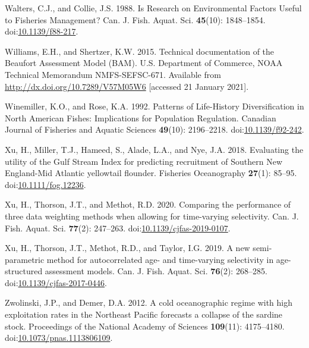 \documentclass[]{article}
\begin{document}
\leavevmode\hypertarget{ref-walters1988Research}{}%
Walters, C.J., and Collie, J.S. 1988. Is Research on Environmental
Factors Useful to Fisheries Management? Can. J. Fish. Aquat. Sci.
\textbf{45}(10): 1848--1854.
doi:\href{https://doi.org/10.1139/f88-217}{10.1139/f88-217}.

\leavevmode\hypertarget{ref-williams2015Technical}{}%
Williams, E.H., and Shertzer, K.W. 2015. Technical documentation of the
Beaufort Assessment Model (BAM). U.S. Department of Commerce, NOAA
Technical Memorandum NMFS-SEFSC-671. Available from
\url{http://dx.doi.org/10.7289/V57M05W6} {[}accessed 21 January 2021{]}.

\leavevmode\hypertarget{ref-winemiller1992Patterns}{}%
Winemiller, K.O., and Rose, K.A. 1992. Patterns of Life-History
Diversification in North American Fishes: Implications for Population
Regulation. Canadian Journal of Fisheries and Aquatic Sciences
\textbf{49}(10): 2196--2218.
doi:\href{https://doi.org/10.1139/f92-242}{10.1139/f92-242}.

\leavevmode\hypertarget{ref-xu2018Evaluating}{}%
Xu, H., Miller, T.J., Hameed, S., Alade, L.A., and Nye, J.A. 2018.
Evaluating the utility of the Gulf Stream Index for predicting
recruitment of Southern New England-Mid Atlantic yellowtail flounder.
Fisheries Oceanography \textbf{27}(1): 85--95.
doi:\href{https://doi.org/10.1111/fog.12236}{10.1111/fog.12236}.

\leavevmode\hypertarget{ref-xu2020Comparing}{}%
Xu, H., Thorson, J.T., and Methot, R.D. 2020. Comparing the performance
of three data weighting methods when allowing for time-varying
selectivity. Can. J. Fish. Aquat. Sci. \textbf{77}(2): 247--263.
doi:\href{https://doi.org/10.1139/cjfas-2019-0107}{10.1139/cjfas-2019-0107}.

\leavevmode\hypertarget{ref-xu2019New}{}%
Xu, H., Thorson, J.T., Methot, R.D., and Taylor, I.G. 2019. A new
semi-parametric method for autocorrelated age- and time-varying
selectivity in age-structured assessment models. Can. J. Fish. Aquat.
Sci. \textbf{76}(2): 268--285.
doi:\href{https://doi.org/10.1139/cjfas-2017-0446}{10.1139/cjfas-2017-0446}.

\leavevmode\hypertarget{ref-zwolinski2012Cold}{}%
Zwolinski, J.P., and Demer, D.A. 2012. A cold oceanographic regime with
high exploitation rates in the Northeast Pacific forecasts a collapse of
the sardine stock. Proceedings of the National Academy of Sciences
\textbf{109}(11): 4175--4180.
doi:\href{https://doi.org/10.1073/pnas.1113806109}{10.1073/pnas.1113806109}.
\end{document}
